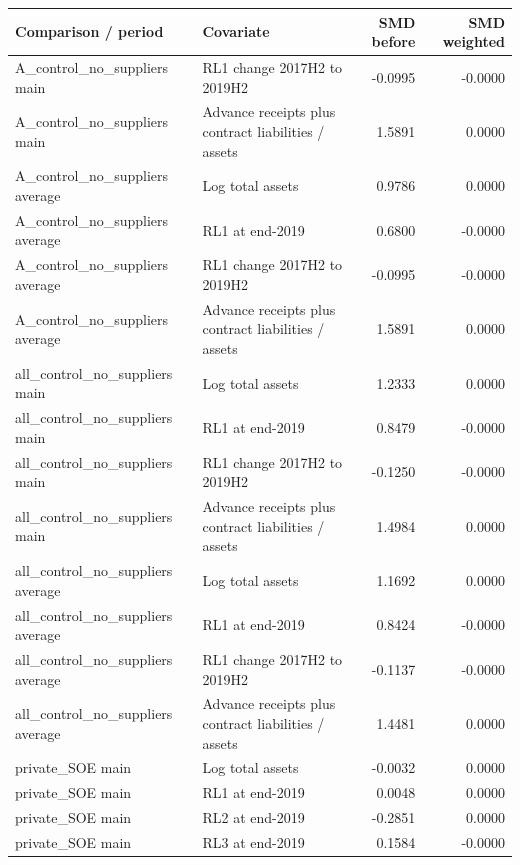 \begin{tabular}{lp{4.8cm}rr}
\toprule
Comparison / period & Covariate & SMD before & SMD weighted \\
\midrule
A\_control\_no\_suppliers main & \raggedright RL1 change 2017H2 to 2019H2 & -0.0995 & -0.0000 \\
A\_control\_no\_suppliers main & \raggedright Advance receipts plus contract liabilities / assets & 1.5891 & 0.0000 \\
A\_control\_no\_suppliers average & \raggedright Log total assets & 0.9786 & 0.0000 \\
A\_control\_no\_suppliers average & \raggedright RL1 at end-2019 & 0.6800 & -0.0000 \\
A\_control\_no\_suppliers average & \raggedright RL1 change 2017H2 to 2019H2 & -0.0995 & -0.0000 \\
A\_control\_no\_suppliers average & \raggedright Advance receipts plus contract liabilities / assets & 1.5891 & 0.0000 \\
all\_control\_no\_suppliers main & \raggedright Log total assets & 1.2333 & 0.0000 \\
all\_control\_no\_suppliers main & \raggedright RL1 at end-2019 & 0.8479 & -0.0000 \\
all\_control\_no\_suppliers main & \raggedright RL1 change 2017H2 to 2019H2 & -0.1250 & -0.0000 \\
all\_control\_no\_suppliers main & \raggedright Advance receipts plus contract liabilities / assets & 1.4984 & 0.0000 \\
all\_control\_no\_suppliers average & \raggedright Log total assets & 1.1692 & 0.0000 \\
all\_control\_no\_suppliers average & \raggedright RL1 at end-2019 & 0.8424 & -0.0000 \\
all\_control\_no\_suppliers average & \raggedright RL1 change 2017H2 to 2019H2 & -0.1137 & -0.0000 \\
all\_control\_no\_suppliers average & \raggedright Advance receipts plus contract liabilities / assets & 1.4481 & 0.0000 \\
private\_SOE main & \raggedright Log total assets & -0.0032 & 0.0000 \\
private\_SOE main & \raggedright RL1 at end-2019 & 0.0048 & 0.0000 \\
private\_SOE main & \raggedright RL2 at end-2019 & -0.2851 & 0.0000 \\
private\_SOE main & \raggedright RL3 at end-2019 & 0.1584 & -0.0000 \\
\bottomrule
\end{tabular}
